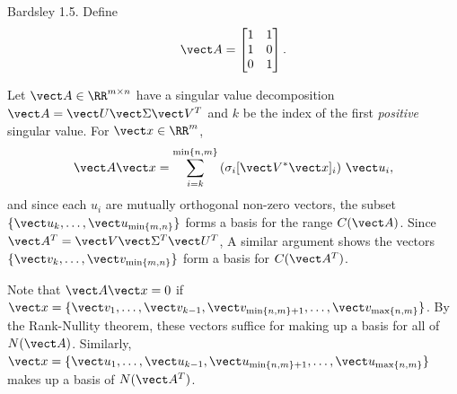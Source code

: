 \documentclass{homework}
\begin{document}
\begin{longproblem} Bardsley 1.5. Define
\renewcommand{\arraystretch}{1.5}
$$
  \vect A = \begin{bmatrix}
  1 & 1\\
  1 & 0\\
  0 & 1\\
  \end{bmatrix}.
$$
\end{longproblem}

\newpage
\mbox{}
\newpage


\begin{solution}
  Let $\vect A \in \RR^{m\times n}$ have a singular value decomposition $\vect A=\vect U\vect \Sigma \vect V^T$ and $k$ be the index of the first \emph{positive} singular value.  For $\vect x \in \RR^m$,  
  $$
    \vect A\vect x = \sum_{i=k}^{\min\{n,m\}} \left(\sigma_i [\vect V^* \vect x]_i\right) \, \vect u_i,
  $$
  and since each $u_i$ are mutually orthogonal non-zero vectors, the subset
  $\{\vect u_k,\dots,\vect u_{\min \{m,n\}}\}$ forms a basis for the range $C(\vect A)$.  
  Since $\vect A^T = \vect V\vect \Sigma^T \vect U^T$, 
  A similar argument shows the vectors 
  $\{\vect v_k,\dots,\vect v_{\min \{m,n\}}\}$ form a basis for $C(\vect A^T)$.

  Note that $\vect A\vect x = 0$ if $\vect x = \{\vect v_1,\dots, \vect
  v_{k-1}, \vect v_{\min\{n,m\}+1},\dots,\vect v_{\max\{n,m\}}\}$.  By the
  Rank-Nullity theorem, these vectors suffice for making up a basis for all of
  $N(\vect A)$.  Similarly, $\vect x = \{\vect u_1,\dots, \vect
  u_{k-1}, \vect u_{\min\{n,m\}+1},\dots,\vect u_{\max\{n,m\}}\}$ makes up a basis of $N(\vect A^T)$.
\end{solution}

\end{document}
